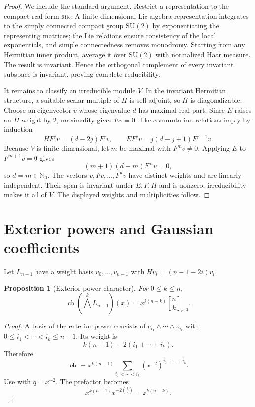\documentclass[11pt,oneside,openany]{book}
\newtheorem{proposition}[theorem]{Proposition}
\theoremstyle{definition}
\theoremstyle{remark}
\newcommand{\Qbinom}[3]{\genfrac{[}{]}{0pt}{}{#1}{#2}_{#3}}
\newcommand{\N}{\mathbb N}
\newcommand{\ch}{\operatorname{ch}}
\begin{document}
\begin{proof}
We include the standard argument.  Restrict a representation to the compact real form $\mathfrak{su}_2$.  A finite-dimensional Lie-algebra representation integrates to the simply connected compact group $\mathrm{SU}(2)$ by exponentiating the representing matrices; the Lie relations ensure consistency of the local exponentials, and simple connectedness removes monodromy.  Starting from any Hermitian inner product, average it over $\mathrm{SU}(2)$ with normalized Haar measure.  The result is invariant.  Hence the orthogonal complement of every invariant subspace is invariant, proving complete reducibility.

It remains to classify an irreducible module $V$.  In the invariant Hermitian structure, a suitable scalar multiple of $H$ is self-adjoint, so $H$ is diagonalizable.  Choose an eigenvector $v$ whose eigenvalue $d$ has maximal real part.  Since $E$ raises an $H$-weight by $2$, maximality gives $Ev=0$.  The commutation relations imply by induction
\[
 H F^jv=(d-2j)F^jv,
 \qquad
 E F^jv=j(d-j+1)F^{j-1}v.
\]
Because $V$ is finite-dimensional, let $m$ be maximal with $F^mv\ne0$.  Applying $E$ to $F^{m+1}v=0$ gives
\[
 (m+1)(d-m)F^mv=0,
\]
so $d=m\in\N_0$.  The vectors $v,Fv,\dots,F^dv$ have distinct weights and are linearly independent.  Their span is invariant under $E,F,H$ and is nonzero; irreducibility makes it all of $V$.  The displayed weights and multiplicities follow.
\end{proof}

\section{Exterior powers and Gaussian coefficients}

Let $L_{n-1}$ have a weight basis $v_0,\dots,v_{n-1}$ with
\(
 Hv_i=(n-1-2i)v_i.
\)

\begin{proposition}[Exterior-power character]\label{prop:exterior-character}
For $0\le k\le n$,
\[
 \ch\!\left(\bigwedge^kL_{n-1}\right)(x)
 =x^{k(n-k)}\Qbinom nk{x^{-2}}.
\]
\end{proposition}

\begin{proof}
A basis of the exterior power consists of
\(
 v_{i_1}\wedge\cdots\wedge v_{i_k}
\)
with $0\le i_1<\cdots<i_k\le n-1$.  Its weight is
\[
 k(n-1)-2(i_1+\cdots+i_k).
\]
Therefore
\[
 \ch=x^{k(n-1)}
 \sum_{i_1<\cdots<i_k}(x^{-2})^{i_1+\cdots+i_k}.
\]
Use  with $q=x^{-2}$.  The prefactor becomes
\[
 x^{k(n-1)}x^{-2\binom k2}=x^{k(n-k)}.
\]
\end{proof}
\end{document}
